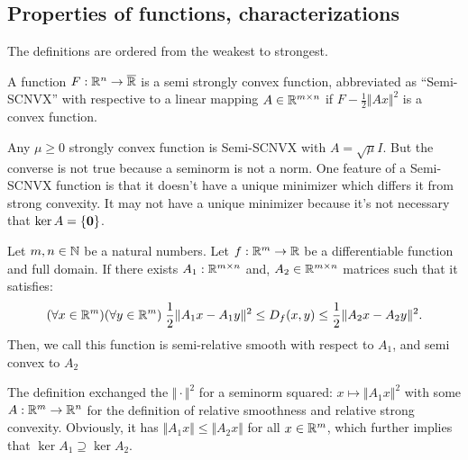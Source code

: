 \documentclass[12pt]{article}
\begin{document}
    \subsection{Properties of functions, characterizations}
        The definitions are ordered from the weakest to strongest. 
        \begin{definition}\label{def:semi-scnvx}
            A function $F: \mathbb R^n \rightarrow \overline {\mathbb R}$ is a semi strongly convex function, abbreviated as ``Semi-SCNVX'' with respective to a linear mapping $A \in \mathbb R^{m \times n}$ if $F - \frac{1}{2}\Vert Ax\Vert^2$ is a convex function. 
        \end{definition}
        \begin{remark}
            Any $\mu \ge 0$ strongly convex function is Semi-SCNVX with $A = \sqrt{\mu}I$. 
            But the converse is not true because a seminorm is not a norm. 
            One feature of a Semi-SCNVX function is that it doesn't have a unique minimizer which differs it from strong convexity. 
            It may not have a unique minimizer because it's not necessary that $\operatorname{ker} A = \{\mathbf 0\}$. 
        \end{remark}
        \begin{definition}\label{def:seminorm-smooth-scnvx}
            Let $m, n\in \mathbb N$ be a natural numbers. 
            Let $f:\mathbb R^m \rightarrow \mathbb R$ be a differentiable function and full domain. 
            If there exists $A_1: \mathbb R^{m\times n}$ and, $A_2 \in \mathbb R^{m \times n}$ matrices such that it satisfies:
            \begin{align*}
                (\forall x \in \mathbb R^m)(\forall y \in \mathbb R^m)\;
                \frac{1}{2}\Vert A_1x - A_1y\Vert^2 \le 
                D_f(x, y) \le \frac{1}{2}\Vert A_2x - A_2y\Vert^2. 
            \end{align*}
            Then, we call this function is semi-relative smooth with respect to $A_1$, and semi convex to $A_2$
        \end{definition}
        \begin{remark}
            The definition exchanged the $\Vert \cdot\Vert^2$ for a seminorm squared: $x \mapsto \Vert A_1x\Vert^2$ with some $A: \mathbb R^m \rightarrow \mathbb R^n$ for the definition of relative smoothness and relative strong convexity. 
            Obviously, it has $\Vert A_1x\Vert \le \Vert A_2x\Vert$ for all $x\in \mathbb R^m$, which further implies that $\ker A_1\supseteq\ker A_2$. 
        \end{remark}
\end{document}
